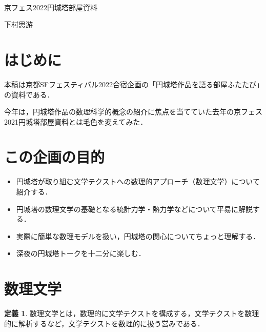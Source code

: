 \documentclass[10pt, a5paper, twoside]{jsarticle}
\theoremstyle{definition}
\newtheorem{dfn}{定義}
\begin{document}
	{\Large 　} %

	\begin{center}

		\Large{京フェス2022円城塔部屋資料}

		\vspace{3mm}
		
		\large{下村思游}

	\end{center}

	\vspace{3mm}

	\section{はじめに}

		本稿は京都SFフェスティバル2022合宿企画の「円城塔作品を語る部屋ふたたび」の資料である．

		今年は，円城塔作品の数理科学的概念の紹介に焦点を当てていた去年の京フェス2021円城塔部屋資料とは毛色を変えてみた．

	\section{この企画の目的}

		\begin{itemize}

			\item 円城塔が取り組む文学テクストへの数理的アプローチ（数理文学）について紹介する．

			\item 円城塔の数理文学の基礎となる統計力学・熱力学などについて平易に解説する．

			\item 実際に簡単な数理モデルを扱い，円城塔の関心についてちょっと理解する．

			\item 深夜の円城塔トークを十二分に楽しむ．

		\end{itemize}

	\section{数理文学}

		\begin{dfn}

			数理文学とは，数理的に文学テクストを構成する，文学テクストを数理的に解析するなど，文学テクストを数理的に扱う営みである．

		\end{dfn}
\end{document}
